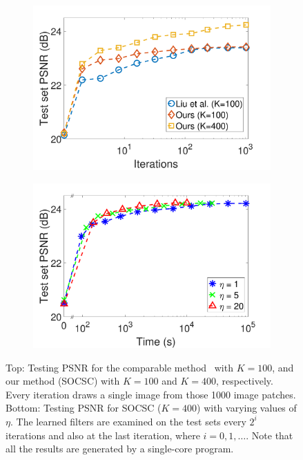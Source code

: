 \begin{figure}[h]
\centering
\begin{subfigure}{0.5\textwidth}
  \includegraphics[width=1\linewidth]{figure/overComplete-ite.pdf}
\end{subfigure}
\begin{subfigure}{0.5\textwidth}
  \includegraphics[width=1\linewidth]{figure/minibatch.pdf}
\end{subfigure}

\caption{Top: Testing PSNR for the comparable method~\cite{liu-2018-first} with $K=100$, and our method (SOCSC) with $K=100$ and $K=400$, respectively. Every iteration draws a single image from those 1000 image patches. Bottom: Testing PSNR for SOCSC ($K=400$) with varying values of $\eta$. The learned filters are examined on the test sets every $2^i$ iterations and also at the last iteration, where $i=0,1,\dots$. Note that all the results are generated by a single-core program.}
\label{fig:overComDicAndMinibatch}
\end{figure} 